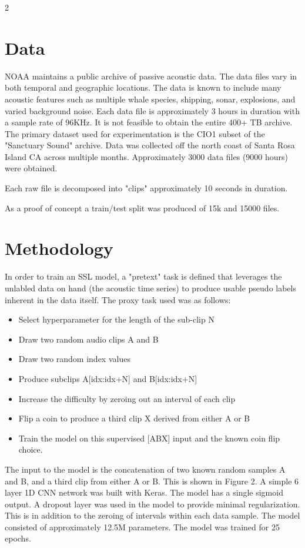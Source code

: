 \documentclass{article}
\begin{document}
\begin{multicols}{2}
 
\section{Data}
NOAA\cite{example1} maintains a public archive of passive acoustic data.  The data files vary in both temporal and geographic locations.  The data is known to include many acoustic features such as multiple whale species, shipping, sonar, explosions, and varied background noise.  Each data file is approximately 3 hours in duration with a sample rate of 96KHz.   It is not feasible to obtain the entire 400+ TB archive.  The primary dataset used for experimentation is the CIO1 subset of the "Sanctuary Sound" archive.  Data was collected off the north coast of Santa Rosa Island CA across multiple months.  Approximately 3000 data files (9000 hours) were obtained.   

Each raw file is decomposed into "clips" approximately 10 seconds in duration.  

As a proof of concept a train/test split was produced of 15k and 15000 files.



\section{Methodology}
In order to train an SSL model, a "pretext" task is defined that leverages the unlabled data on hand (the acoustic time series) to produce usable pseudo labels inherent in the data itself.  The proxy task used was as follows:

\begin{itemize}
\item Select hyperparameter for the length of the sub-clip N 
\item Draw two random audio clips A and B
\item Draw two random index values
\item Produce subclips A[idx:idx+N] and B[idx:idx+N]
\item Increase the difficulty by zeroing out an interval of each clip
\item Flip a coin to produce a third clip X derived from either A or B
\item Train the model on this supervised [ABX] input and the known coin flip choice.
\end{itemize}

The input to the model is the concatenation of two known random samples A and B, and a third clip from either A or B.   This is shown in Figure 2.
A simple 6 layer 1D CNN network was built with Keras.  The model has a single sigmoid output.  A dropout layer was used in the model to provide minimal regularization.  This is in addition to the zeroing of intervals within each data sample.  The model consisted of approximately 12.5M parameters.   The model was trained for 25 epochs.


\end{multicols}
\end{document}
